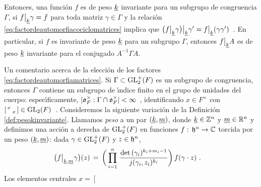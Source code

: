 Entonces, una funci\'{o}n $f$ es de peso $\underline{k}$ invariante para un subgrupo
de congruencia $\Gamma$, si $f\big|_{\underline{k}}{\gamma}=f$ para toda
matriz $\gamma\in\Gamma$ y la relaci\'{o}n
\eqref{eq:factordeautomorfiacociclomatrices} implica que
\begin{math}
	\big(f\big|_{\underline{k}}{\gamma}\big)
		\big|_{\underline{k}}{\gamma'}=
		f\big|_{\underline{k}}{(\gamma\gamma')}
\end{math}~. En particular, si $f$ es invariante de peso $\underline{k}$ para un
subgrupo $\Gamma$, entonces $f\big|_{\underline{k}}{A}$ es de peso
$\underline{k}$ invariante para el conjugado $A^{-1}\Gamma A$.

\begin{obsEleccionDelFactor}\label{obs:elecciondelfactor}
	Un comentario acerca de la elecci\'{o}n de los factores
	\eqref{eq:factordeautomorfiamatrices}. Si $\Gamma\subset\mathrm{GL}^{+}_{2}(F)$
	es un subgrupo de congruencia, entonces $\Gamma$ contiene un subgrupo
	de \'{\i}ndice finito en el grupo de unidades del cuerpo:
	espec\'{\i}ficamente,
	\begin{math}
		|\mathfrak{o}_{F}^{\times}:\Gamma\cap\mathfrak{o}_{F}^{\times}|<\infty
	\end{math}~, identificando $x\in F^{\times}$ con
	\begin{math}
		\left[\begin{smallmatrix}
			x & \\ & x
		\end{smallmatrix}\right]\in
			\mathrm{GL}_{2}(F)
	\end{math}~.
	Consideremos la siguiente variaci\'{o}n de la Definici\'{o}n~%
	\ref{def:pesokinvariante}. Llamamos \emph{peso} a un par
	$(\underline{k},\underline{m})$, donde $\underline{k}\in\mathbb{Z}^{n}$ y
	$\underline{m}\in\mathbb{R}^{n}$ y definimos una acci\'{o}n a derecha de
	$\mathrm{GL}^{+}_{2}(F)$ en funciones $f:\,\mathfrak{h}^{n}\rightarrow\mathbb{C}$ torcida por
	un peso $(\underline{k},\underline{m})$: dada $\gamma\in\mathrm{GL}^{+}_{2}(F)$ y
	$z\in\mathfrak{h}^{n}$,
	\begin{align*}
		\big(f\operadormatrices{\peso{k},\peso{m}}{\gamma}\big)(z)
			& \,=\,\bigg(\prod_{i=1}^{n}\,
				\frac{\det(\gamma_{i})^{k_{i}+m_{i}-1}}{%
					j(\gamma_{i},z_{i})^{k_{i}}}\bigg)\,
			f(\gamma\cdot z)
		\text{ .}
	\end{align*}
	Los elementos centrales
	\begin{math}
		x=\left[\begin{smallmatrix}

\end{smallmatrix}
\end{math}
\end{obsEleccionDelFactor}
